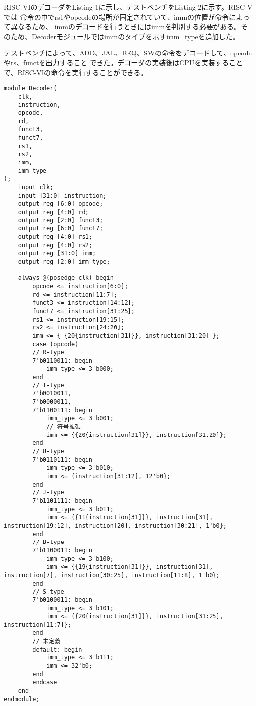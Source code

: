 \documentclass{jlreq}
\begin{document}
RISC-VIのデコーダをListing 1に示し、テストベンチをListing 2に示す。RISC-Vでは
命令の中でrs1やopcodeの場所が固定されていて、immの位置が命令によって異なるため、
immのデコードを行うときにはimmを判別する必要がある。そのため、Decoderモジュールではimmのタイプを示すimm\_typeを追加した。

テストベンチによって、ADD、JAL、BEQ、SWの命令をデコードして、opcodeやrs、functを出力すること
できた。デコーダの実装後はCPUを実装することで、RISC-VIの命令を実行することができる。


\begin{lstlisting}[caption={Decoderモジュール}]
	module Decoder(
	clk,
	instruction,
	opcode,
	rd,
	funct3,
	funct7,
	rs1,
	rs2,
	imm,
	imm_type
);
	input clk;
	input [31:0] instruction;
	output reg [6:0] opcode;
	output reg [4:0] rd;
	output reg [2:0] funct3;
	output reg [6:0] funct7;
	output reg [4:0] rs1;
	output reg [4:0] rs2;
	output reg [31:0] imm;
	output reg [2:0] imm_type;

	always @(posedge clk) begin
		opcode <= instruction[6:0];
		rd <= instruction[11:7];
		funct3 <= instruction[14:12];
		funct7 <= instruction[31:25];
		rs1 <= instruction[19:15];
		rs2 <= instruction[24:20];
		imm <= { {20{instruction[31]}}, instruction[31:20] };
		case (opcode)
		// R-type
		7'b0110011: begin
			imm_type <= 3'b000;
		end
		// I-type
		7'b0010011,
		7'b0000011,
		7'b1100111: begin 
			imm_type <= 3'b001;
			// 符号拡張
			imm <= {{20{instruction[31]}}, instruction[31:20]};
		end
		// U-type
		7'b0110111: begin
			imm_type <= 3'b010;
			imm <= {instruction[31:12], 12'b0};
		end
		// J-type
		7'b1101111: begin
			imm_type <= 3'b011;
			imm <= {{11{instruction[31]}}, instruction[31], instruction[19:12], instruction[20], instruction[30:21], 1'b0};
		end
		// B-type
		7'b1100011: begin
			imm_type <= 3'b100;
			imm <= {{19{instruction[31]}}, instruction[31], instruction[7], instruction[30:25], instruction[11:8], 1'b0};
		end
		// S-type
		7'b0100011: begin
			imm_type <= 3'b101;
			imm <= {{20{instruction[31]}}, instruction[31:25], instruction[11:7]}; 
		end
		// 未定義
		default: begin
            imm_type <= 3'b111;
            imm <= 32'b0;
        end
		endcase
	end
endmodule;
\end{lstlisting}
\end{document}

